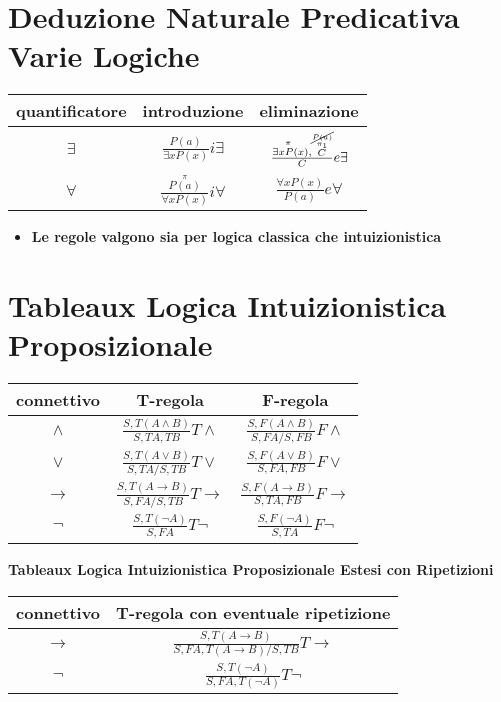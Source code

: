\documentclass[a4paper,12pt, oneside]{book}
\begin{document}
\section*{Deduzione Naturale Predicativa Varie Logiche}
\begin{table}[H]
  \Large
  \centering
  \begin{tabular}{c|c|c}
    quantificatore & introduzione & eliminazione\\
    \hline
    $\exists$ & $\frac{P(a)}{\exists xP(x)}i\exists$
                                  &$\frac{\stackrel{\pi}{\exists xP(x}),
                                    \stackrel{
                                    \stackrel{\cancel{P(a)}}{\pi_1}}{C}}{C}
                                    e\exists$\\
    \hline
    $\forall$ & $\frac{\stackrel{\pi}{P(a)}}{\forall xP(x)}i\forall$
                                  &$\frac{\forall xP(x)}{P(a)}e\forall$\\
  \end{tabular}
\end{table}
\begin{itemize}
  \item \textbf{Le regole valgono sia per logica classica che intuizionistica}
\end{itemize}
\section*{Tableaux Logica Intuizionistica Proposizionale}
\begin{table}[H]
  \Large
  \centering
  \begin{tabular}{c||c|c}
    connettivo& T-regola& F-regola\\
    \hline
    \hline
    $\land$ & $\frac{S,T(A\land B)}{S,TA,TB}T\land$&
                        $\frac{S,F(A\land B)}{S,FA/S,FB}F\land$\\
    \hline
    $\lor$ & $\frac{S,T(A\lor B)}{S,TA/S,TB}T\lor$&
                        $\frac{S,F(A\lor B)}{S,FA,FB}F\lor$\\
    \hline
    $\to$ & $\frac{S,T(A\to B)}{S,FA/S,TB}T\to$&
                        $\frac{S,F(A\to B)}{S,TA,FB}F\to$\\
    \hline
    $\neg$ & $\frac{S,T(\neg A)}{S,FA}T\neg$&
                        $\frac{S,F(\neg A)}{S,TA}F\neg$\\
    \hline
  \end{tabular}
\end{table}
\begin{center}
  \textbf{Tableaux Logica Intuizionistica Proposizionale Estesi con Ripetizioni}
\end{center}
\begin{table}[H]
  \Large
  \centering
  \begin{tabular}{c||c}
    connettivo& T-regola con eventuale ripetizione\\
    \hline
    \hline
    $\to$ & $\frac{S,T(A\to B)}{S,FA,T(A\to B)/S,TB}T\to$\\
    \hline
    $\neg$ & $\frac{S,T(\neg A)}{S,FA,T(\neg A)}T\neg$
  \end{tabular}
\end{table}
\end{document}
